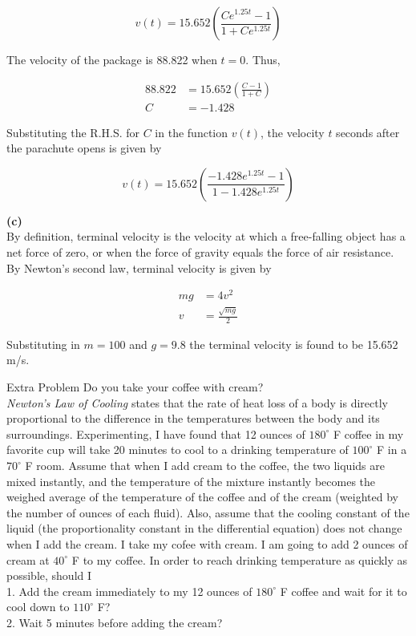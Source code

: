 \documentclass{article}
\begin{document}
    \[
        v(t) = 15.652\left(\frac{Ce^{1.25t}-1}{1+Ce^{1.25t}}\right)
    \]

    The velocity of the package is 88.822 when $t=0$. Thus,

    \begin{align*}
        88.822  &= 15.652\left(\frac{C-1}{1+C}\right) \\
        C       &= -1.428
    \end{align*}

    Substituting the R.H.S. for $C$ in the function $v(t)$, the velocity $t$ seconds after the parachute opens is given by

    \[
        v(t) = 15.652\left(\frac{-1.428e^{1.25t}-1}{1-1.428e^{1.25t}}\right)
    \]

    \textbf{(c)} \\
    By definition, terminal velocity is the velocity at which a free-falling object has a net force of zero, or when the force of gravity equals the force of air resistance. By Newton's second law, terminal velocity is
    given by

    \begin{align*}
        mg  &= 4v^2 \\
        v   &= \frac{\sqrt{mg}}{2}
    \end{align*}

    Substituting in $m=100$ and $g=9.8$ the terminal velocity is found to be 15.652 m/s.


    \begin{tbhtheorem}{Extra Problem}
        Do you take your coffee with cream? \\

        \textit{Newton's Law of Cooling} states that the rate of heat loss of a body is directly proportional to the difference in the temperatures between the body and its surroundings. Experimenting, I have found that
        12 ounces of $180^{\circ}$ F coffee in my favorite cup will take 20 minutes to cool to a drinking temperature of $100^{\circ}$ F in a $70^{\circ}$ F room. Assume that when I add cream to the coffee, the two
        liquids are mixed instantly, and the temperature of the mixture instantly becomes the weighed average of the temperature of the coffee and of the cream (weighted by the number of ounces of each fluid). Also,
        assume that the cooling constant of the liquid (the proportionality constant in the differential equation) does not change when I add the cream. I take my cofee with cream. I am going to add 2 ounces of cream
        at $40^{\circ}$ F to my coffee. In order to reach drinking temperature as quickly as possible, should I \\

        1. Add the cream immediately to my 12 ounces of $180^{\circ}$ F coffee and wait for it to cool down to $110^{\circ}$ F? \\
        2. Wait 5 minutes before adding the cream?
    \end{tbhtheorem}
\end{document}
